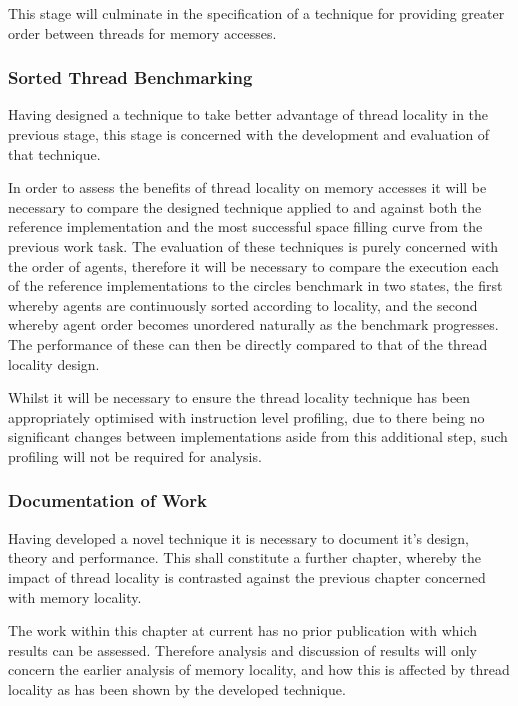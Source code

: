         This stage will culminate in the specification of a technique for providing greater order between threads for memory accesses.
        
      \subsubsection*{Sorted Thread Benchmarking}
        Having designed a technique to take better advantage of thread locality in the previous stage, this stage is concerned with the development and evaluation of that technique.
        
        In order to assess the benefits of thread locality on memory accesses it will be necessary to compare the designed technique applied to and against both the reference implementation and the most successful space filling curve from the previous work task. The evaluation of these techniques is purely concerned with the order of agents, therefore it will be necessary to compare the execution each of the reference implementations to the circles benchmark in two states, the first whereby agents are continuously sorted according to locality, and the second whereby agent order becomes unordered naturally as the benchmark progresses. The performance of these can then be directly compared to that of the thread locality design. 
        
        Whilst it will be necessary to ensure the thread locality technique has been appropriately optimised with instruction level profiling, due to there being no significant changes between implementations aside from this additional step, such profiling will not be required for analysis.
        
      \subsubsection*{Documentation of Work}
        Having developed a novel technique it is necessary to document it's design, theory and performance. This shall constitute a further chapter, whereby the impact of thread locality is contrasted against the previous chapter concerned with memory locality.
        
        The work within this chapter at current has no prior publication with which results can be assessed. Therefore analysis and discussion of results will only concern the earlier analysis of memory locality, and how this is affected by thread locality as has been shown by the developed technique.
        
